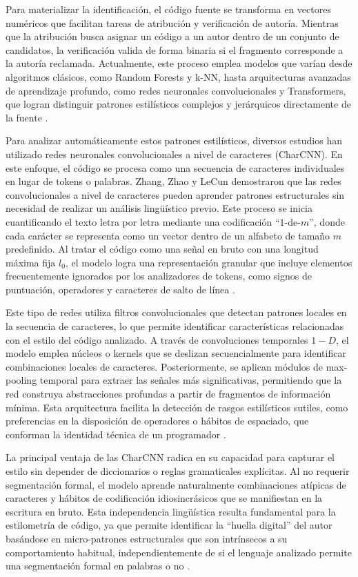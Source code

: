 Para materializar la identificación, el código fuente se transforma en vectores numéricos que facilitan tareas de atribución y verificación de autoría. Mientras que la atribución busca asignar un código a un autor dentro de un conjunto de candidatos, la verificación valida de forma binaria si el fragmento corresponde a la autoría reclamada. Actualmente, este proceso emplea modelos que varían desde algoritmos clásicos, como Random Forests y k-NN, hasta arquitecturas avanzadas de aprendizaje profundo, como redes neuronales convolucionales y Transformers, que logran distinguir patrones estilísticos complejos y jerárquicos directamente de la fuente \cite{Horvath2026ProgrammerAttribution}.

Para analizar automáticamente estos patrones estilísticos, diversos estudios han utilizado redes neuronales convolucionales a nivel de caracteres (CharCNN). En este enfoque, el código se procesa como una secuencia de caracteres individuales en lugar de tokens o palabras. Zhang, Zhao y LeCun \cite{Zhang2015CharCNN} demostraron que las redes convolucionales a nivel de caracteres pueden aprender patrones estructurales sin necesidad de realizar un análisis lingüístico previo. Este proceso se inicia cuantificando el texto letra por letra mediante una codificación ``$1$-de-$m$'', donde cada carácter se representa como un vector dentro de un alfabeto de tamaño $m$ predefinido. Al tratar el código como una señal en bruto con una longitud máxima fija $l_0$, el modelo logra una representación granular que incluye elementos frecuentemente ignorados por los analizadores de tokens, como signos de puntuación, operadores y caracteres de salto de línea \cite{Zhang2015CharCNN}.

Este tipo de redes utiliza filtros convolucionales que detectan patrones locales en la secuencia de caracteres, lo que permite identificar características relacionadas con el estilo del código analizado. A través de convoluciones temporales $1-D$, el modelo emplea núcleos o kernels que se deslizan secuencialmente para identificar combinaciones locales de caracteres. Posteriormente, se aplican módulos de max-pooling temporal para extraer las señales más significativas, permitiendo que la red construya abstracciones profundas a partir de fragmentos de información mínima. Esta arquitectura facilita la detección de rasgos estilísticos sutiles, como preferencias en la disposición de operadores o hábitos de espaciado, que conforman la identidad técnica de un programador \cite{Zhang2015CharCNN}.

La principal ventaja de las CharCNN radica en su capacidad para capturar el estilo sin depender de diccionarios o reglas gramaticales explícitas. Al no requerir segmentación formal, el modelo aprende naturalmente combinaciones atípicas de caracteres y hábitos de codificación idiosincrásicos que se manifiestan en la escritura en bruto. Esta independencia lingüística resulta fundamental para la estilometría de código, ya que permite identificar la ``huella digital'' del autor basándose en micro-patrones estructurales que son intrínsecos a su comportamiento habitual, independientemente de si el lenguaje analizado permite una segmentación formal en palabras o no \cite{CodeStylist2023}.

